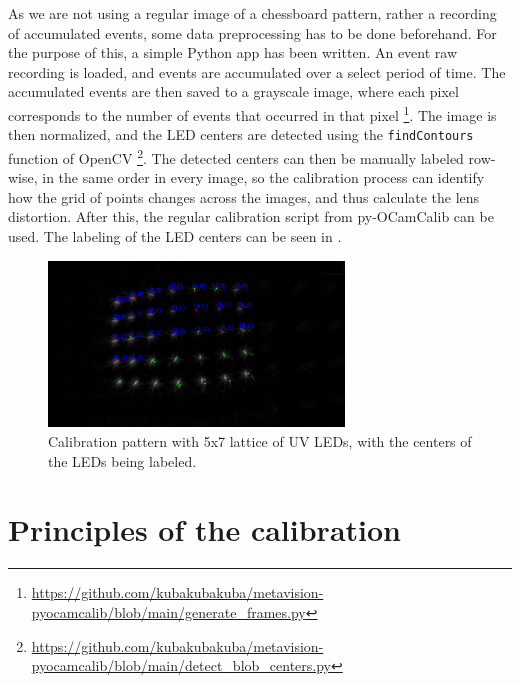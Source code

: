 As we are not using a regular image of a chessboard pattern, rather a recording of accumulated events, some data preprocessing has to be done beforehand.
For the purpose of this, a simple Python app has been written. An event raw recording is loaded, and events are accumulated over a select period of time.
The accumulated events are then saved to a grayscale image, where each pixel corresponds to the number of events that occurred in that
pixel \footnote{\url{https://github.com/kubakubakuba/metavision-pyocamcalib/blob/main/generate_frames.py}}. The image is then normalized,
and the LED centers are detected using the \texttt{findContours} function of OpenCV \footnote{\url{https://github.com/kubakubakuba/metavision-pyocamcalib/blob/main/detect_blob_centers.py}}.
The detected centers can then be manually labeled row-wise, in the same order in every image, so the calibration process can identify how the grid of points
changes across the images, and thus calculate the lens distortion.
After this, the regular calibration script from py-OCamCalib can be used. The labeling of the LED centers can be seen in .

\begin{figure}[H]
  \centering
  \includegraphics[width=0.7\textwidth]{./fig/photos/lattice_blobs.png}
  \caption{Calibration pattern with 5x7 lattice of UV LEDs, with the centers of the LEDs being labeled.}
  \label{fig:calibration_pattern_labeled}
\end{figure}

\section{Principles of the calibration}

